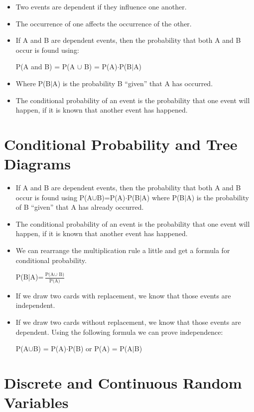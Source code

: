 \documentclass[../stats.tex]{subfiles}
\begin{document}
\begin{itemize}
    \item Two events are dependent if they influence one another.
    \item The occurrence of one affects the occurrence of the other.
    \item If A and B are dependent events, then the probability that both A and B occur is found using:
    \begin{center}
        P(A and B) = P(A $\cup$ B) = P(A)$\cdot$P(B$|$A)
    \end{center}
    \item Where P(B$|$A) is the probability B ``given'' that A has occurred.
    \item The conditional probability of an event is the probability that one event will happen, if it is known that another event has happened.
\end{itemize}

\section{Conditional Probability and Tree Diagrams}
\begin{itemize}
    \item If A and B are dependent events, then the probability that both A and B occur is found using 
    P(A$\cup$B)=P(A)$\cdot$P(B$|$A) where P(B$|$A) is the probability of B ``given'' that A has already occurred.
    \item The conditional probability of an event is the probability that one event will happen, if it is known that another event has happened.
    \item We can rearrange the multiplication rule a little and get a formula for conditional probability.
    \begin{center}
        P(B|A)=$\frac{\text{P(A$\cup$ B)}}{\text{P(A)}}$
    \end{center}
\end{itemize}
\begin{itemize}
    \item If we draw two cards with replacement, we know that those events are independent.
    \item If we draw two cards without replacement, we know that those events are dependent.
    Using the following formula we can prove independence:
    \begin{center}
        P(A$\cup$B) = P(A)$\cdot$P(B) or P(A) = P(A$|$B)
    \end{center}
\end{itemize}
\section{Discrete and Continuous Random Variables}
\end{document}
